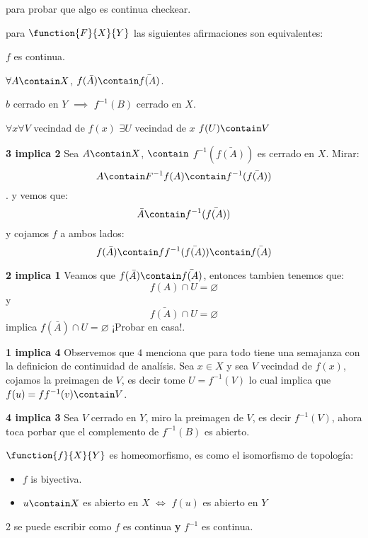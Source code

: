 para probar que algo es continua  checkear.

\begin{thm}
	para $\function{F}{X}{Y}$ las siguientes afirmaciones son equivalentes:
	\item $f$ es continua.
	\item $\forall A \contain X$, $f(\bar{A}) \contain \bar{f(A)}$.
	\item $b$ cerrado en $Y$ $ \implies$ $f^{-1}(B)$ cerrado en $X$.
	\item $\forall x \forall V$ vecindad de $f(x)$  $\exists U$ vecindad de $x$ $f(U) \contain V$
\end{thm}

\textbf{3 implica 2}
Sea $A \contain X$, $\contain$ $f^{-1}(\bar{f(A)}) $ es cerrado en $X$. Mirar:
\[ A \contain F^{-1}f(A) \contain f^{-1}(\bar{f(A)}) \]. y vemos que:
\[ \bar{A} \contain f^{-1}(\bar{f(A)}) \]
y cojamos $f$ a ambos lados:
\[ f(\bar{A}) \contain ff^{-1}(\bar{f(A)}) \contain \bar{f(A)} \]

\textbf{2 implica 1}
Veamos que $f(\bar{A}) \contain \bar{f(A)} $, entonces tambien tenemos que:
\[ f(A) \cap U = \varnothing \]
y 
\[ \bar{f(A)} \cap U = \varnothing \]
implica $ f(\bar{A}) \cap U = \varnothing $
¡Probar en casa!.

\textbf{1 implica 4}
Observemos que $4$ menciona que para todo tiene una semajanza con la definicion de continuidad de analísis. 
Sea $x \in X$ y sea $V$ vecindad de $f(x)$, cojamos la preimagen de $V$, es decir tome $U = f^{-1}(V) $ lo cual implica que $ f(u) = ff^{-1}(v) \contain V$.

\textbf{4 implica 3}
Sea $V$ cerrado en $Y$, miro la preimagen de $V$, es decir $ f^{-1}(V) $, ahora toca porbar que el complemento de $ f^{-1}(B) $ es abierto.


\begin{define}
	$\function{f}{X}{Y}$ es homeomorfismo, es como el isomorfismo de topología:
	\begin{itemize}
		\item $f$ is biyectiva.
		\item $u \contain X$ es abierto en $X$ $\iff$ $f(u)$ es abierto en $Y$
		
	\end{itemize}
	2 se puede escribir como $f$ es continua \textbf{y} $f^{-1}$ es continua.
\end{define}





